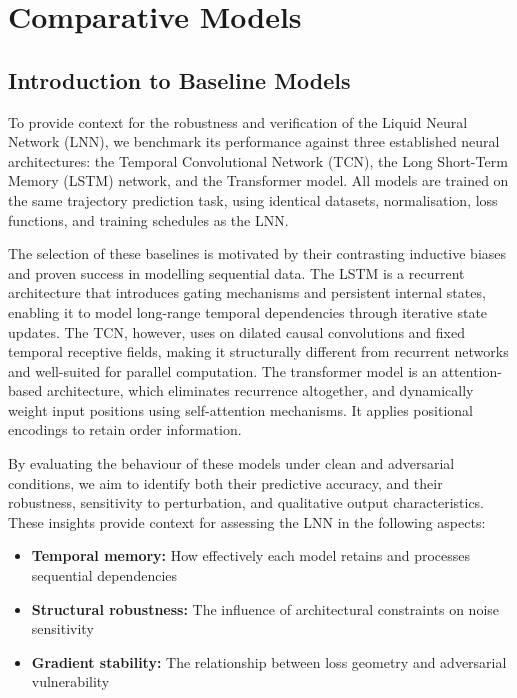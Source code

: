 \chapter{Comparative Models}

\section{Introduction to Baseline Models}

To provide context for the robustness and verification of the Liquid Neural Network (LNN), we benchmark its performance against three established neural architectures: the Temporal Convolutional Network (TCN), the Long Short-Term Memory (LSTM) network, and the Transformer model. All models are trained on the same trajectory prediction task, using identical datasets, normalisation, loss functions, and training schedules as the LNN.

The selection of these baselines is motivated by their contrasting inductive biases and proven success in modelling sequential data. The LSTM is a recurrent architecture that introduces gating mechanisms and persistent internal states, enabling it to model long-range temporal dependencies through iterative state updates. The TCN, however, uses on dilated causal convolutions and fixed temporal receptive fields, making it structurally different from recurrent networks and well-suited for parallel computation. The transformer model is an attention-based architecture, which eliminates recurrence altogether, and dynamically weight input positions using self-attention mechanisms. It applies positional encodings to retain order information.

By evaluating the behaviour of these models under clean and adversarial conditions, we aim to identify both their predictive accuracy, and their robustness, sensitivity to perturbation, and qualitative output characteristics. These insights provide context for assessing the LNN in the following aspects:

\begin{itemize}
    \item \textbf{Temporal memory:} How effectively each model retains and processes sequential dependencies
    \item \textbf{Structural robustness:} The influence of architectural constraints on noise sensitivity
    \item \textbf{Gradient stability:} The relationship between loss geometry and adversarial vulnerability
\end{itemize}


